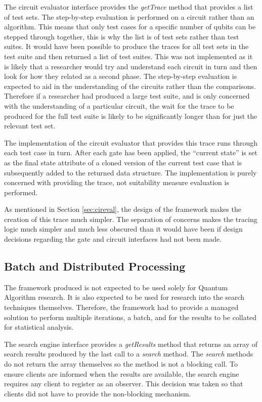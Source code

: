 The circuit evaluator interface provides the \emph{getTrace} method that provides a list of test sets.
The step-by-step evaluation is performed on a circuit rather than an algorithm.
This means that only test cases for a specific number of qubits can be stepped through together, this is why the list is of test sets rather than test suites.
It would have been possible to produce the traces for all test sets in the test suite and then returned a list of test suites.
This was not implemented as it is likely that a researcher would try and understand each circuit in turn and then look for how they related as a second phase.
The step-by-step evaluation is expected to aid in the understanding of the circuits rather than the comparisons.
Therefore if a researcher had produced a large test suite, and is only concerned with the understanding of a particular circuit, the wait for the trace to be produced for the full test suite is likely to be significantly longer than for just the relevant test set.

The implementation of the circuit evaluator that provides this trace runs through each test case in turn.
After each gate has been applied, the ``current state'' is set as the final state attribute of a cloned version of the current test case that is subsequently added to the returned data structure.
The implementation is purely concerned with providing the trace, not suitability measure evaluation is performed.

As mentioned in Section \ref{sec:cireval}, the design of the framework makes the creation of this trace much simpler.
The separation of concerns makes the tracing logic much simpler and much less obscured than it would have been if design decisions regarding the gate and circuit interfaces had not been made.

\subsection{Batch and Distributed Processing}
The framework produced is not expected to be used solely for Quantum Algorithm research.
It is also expected to be used for research into the search techniques themselves.
Therefore, the framework had to provide a managed solution to perform multiple iterations, a batch, and for the results to be collated for statistical analysis.

The search engine interface provides a \emph{getResults} method that returns an array of search results produced by the last call to a \emph{search} method.
The \emph{search} methods do not return the array themselves so the method is not a blocking call.
To ensure clients are informed when the results are available, the search engine requires any client to register as an observer.
This decision was taken so that clients did not have to provide the non-blocking mechanism.

